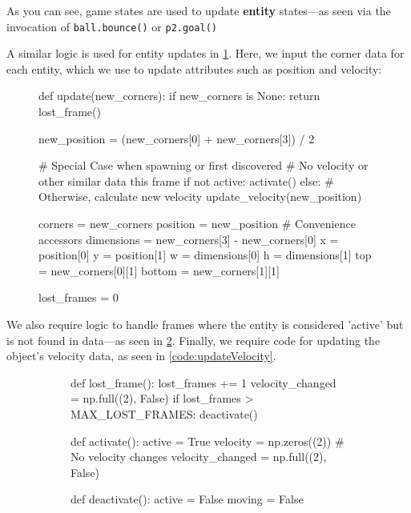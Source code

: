 \documentclass{report}
\newcommand{\state}[1]{\textbf{#1}}
\begin{document}
As you can see, game states are used to update \state{entity} states---as seen via the invocation of \texttt{ball.bounce()} or \texttt{p2.goal()} 

A similar logic is used for entity updates in \cref{code:entUpdate}. Here, we input the corner data for each entity, which we use to update attributes such as position and velocity:

\begin{figure}[!htb]
    \centering
    \begin{codeblock}
def update(new_corners):
    if new_corners is None:
        return lost_frame()
    
    new_position = (new_corners[0] + new_corners[3]) / 2

    # Special Case when spawning or first discovered
    # No velocity or other similar data this frame
    if not active:
        activate()
    else: # Otherwise, calculate new velocity 
        update_velocity(new_position)

    corners = new_corners
    position = new_position
    # Convenience accessors
    dimensions = new_corners[3] - new_corners[0]
    x = position[0]
    y = position[1]
    w = dimensions[0]
    h = dimensions[1]
    top = new_corners[0][1]
    bottom = new_corners[1][1]

    lost_frames = 0
\end{codeblock}
    \captionof{code}{The generic \state{entity} \texttt{update} logic}
    \label{code:entUpdate}
\end{figure}

We also require logic to handle frames where the entity is considered 'active' but is not found in data---as seen in \cref{code:entAux}. Finally, we require code for updating the object's velocity data, as seen in \cref{code:updateVelocity}.

\begin{figure}[!htb]
    \centering
    \begin{subfigure}{\textwidth}
        \centering
        \begin{codeblock}
def lost_frame():
    lost_frames += 1
    velocity_changed = np.full((2), False)
    if lost_frames > MAX_LOST_FRAMES:
        deactivate()    
\end{codeblock}
    \end{subfigure}
    \begin{subfigure}{\textwidth}
    \centering       
    \begin{codeblock}
 def activate():
    active = True
    velocity = np.zeros((2))
    # No velocity changes
    velocity_changed = np.full((2), False)
    
def deactivate():
    active = False
    moving = False 
\end{codeblock}
\end{subfigure}

    \label{code:entAux}
\end{figure}
\end{document}
